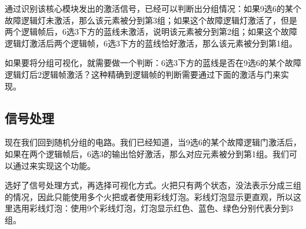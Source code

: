 \begin{figure}[!ht]
\begin{center}
\qquad
{}
\end{center}
\caption{}
\label{i136:137}
\end{figure}

通过识别该核心模块发出的激活信号，已经可以判断出分组情况：如果9选6的某个故障逻辑灯未激活，那么该元素被分到第3组；如果这个故障逻辑灯激活了，但是两个逻辑帧后，6选3下方的蓝线未激活，说明该元素被分到第2组；如果这个故障逻辑灯激活后两个逻辑帧，6选3下方的蓝线恰好激活，那么该元素被分到第1组。

如果要将分组可视化，就需要做一个判断：6选3下方的蓝线是否在9选6的某个故障逻辑灯后2逻辑帧激活？这种精确到逻辑帧的判断需要通过下面的激活与门来实现。

\subsection{信号处理}

现在我们回到随机分组的电路。我们已经知道，当9选6的某个故障逻辑门激活后，如果在两个逻辑帧后，6选3的输出恰好激活，那么对应元素被分到第1组。我们可以通过来实现这个功能。

选好了信号处理方式，再选择可视化方式。火把只有两个状态，没法表示分成三组的情况，因此只能使用多个火把或者使用彩线灯泡。彩线灯泡显示更直观，所以这里选用彩线灯泡：使用9个彩线灯泡，灯泡显示红色、蓝色、绿色分别代表分到3组。

